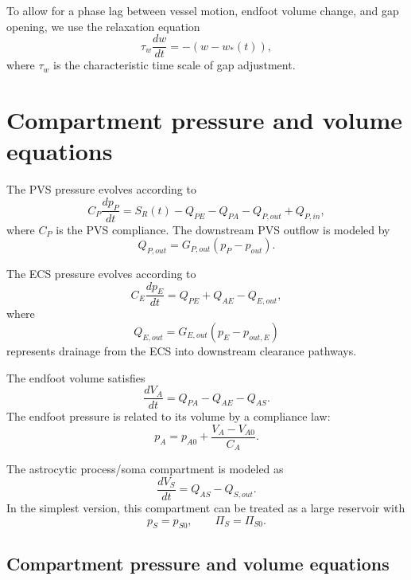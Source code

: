 \documentclass{article}
\begin{document}
To allow for a phase lag between vessel motion, endfoot volume change, and gap opening, we use the
relaxation equation
\begin{equation}
    \tau_w \frac{dw}{dt}
    =
    -\left(w-w_*(t)\right),
\end{equation}
where \(\tau_w\) is the characteristic time scale of gap adjustment.
\section{Compartment pressure and volume equations}

The PVS pressure evolves according to
\begin{equation}
    C_P \frac{dp_P}{dt}
    =
    S_R(t)
    -
    Q_{PE}
    -
    Q_{PA}
    -
    Q_{P,out}
    +
    Q_{P,in},
\end{equation}
where \(C_P\) is the PVS compliance. The downstream PVS outflow is modeled by
\begin{equation}
    Q_{P,out}
    =
    G_{P,out}(p_P-p_{out}).
\end{equation}

The ECS pressure evolves according to
\begin{equation}
    C_E \frac{dp_E}{dt}
    =
    Q_{PE}
    +
    Q_{AE}
    -
    Q_{E,out},
\end{equation}
where
\begin{equation}
    Q_{E,out}
    =
    G_{E,out}(p_E-p_{out,E})
\end{equation}
represents drainage from the ECS into downstream clearance pathways.

The endfoot volume satisfies
\begin{equation}
    \frac{dV_A}{dt}
    =
    Q_{PA}
    -
    Q_{AE}
    -
    Q_{AS}.
\end{equation}
The endfoot pressure is related to its volume by a compliance law:
\begin{equation}
    p_A
    =
    p_{A0}
    +
    \frac{V_A-V_{A0}}{C_A}.
\end{equation}

The astrocytic process/soma compartment is modeled as
\begin{equation}
    \frac{dV_S}{dt}
    =
    Q_{AS}
    -
    Q_{S,out}.
\end{equation}
In the simplest version, this compartment can be treated as a large reservoir with
\[
    p_S=p_{S0},
    \qquad
    \Pi_S=\Pi_{S0}.
\]
\subsection{Compartment pressure and volume equations}
\end{document}
